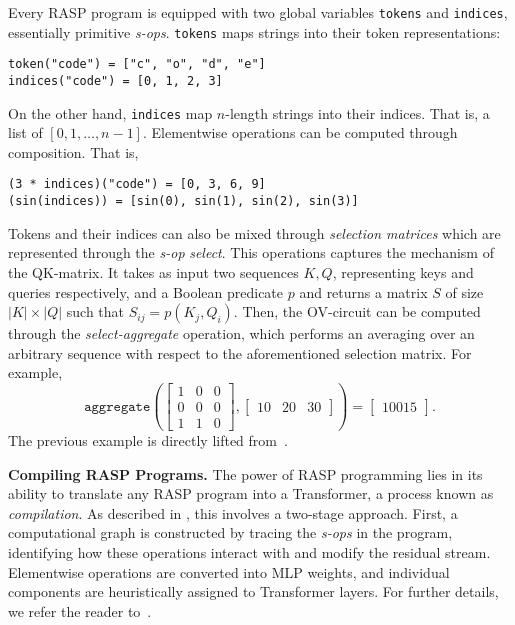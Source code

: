 \documentclass{article}
\begin{document}
Every RASP program is equipped with two global variables \texttt{tokens} and \texttt{indices},
essentially primitive \textit{s-ops}. \texttt{tokens} maps strings into their token representations:
\begin{center}
\begin{verbatim}token("code") = ["c", "o", "d", "e"]
indices("code") = [0, 1, 2, 3]
\end{verbatim}
\end{center}
On the other hand, \texttt{indices} map $n$-length strings into their indices. That is, 
a list of $[0, 1, \ldots, n-1]$. Elementwise operations can be computed through composition. That
is,
\begin{verbatim}(3 * indices)("code") = [0, 3, 6, 9]
(sin(indices)) = [sin(0), sin(1), sin(2), sin(3)]
\end{verbatim}
Tokens and their indices can also be mixed through \textit{selection matrices} which are represented
through the \textit{s-op} \textit{select}. This operations captures the mechanism of the QK-matrix.
It takes as input two sequences $K, Q$, representing keys and queries respectively, 
and a Boolean predicate $p$ and returns a matrix $S$ of size $|K| \times |Q|$ such that 
$S_{ij} = p(K_j, Q_i)$. Then, the OV-circuit can be computed through the \textit{select-aggregate}
operation, which performs an averaging over an arbitrary sequence with respect to the
aforementioned selection matrix. For example,
\[
\texttt{aggregate}\left(\begin{bmatrix}
1 & 0 & 0 \\ 
0 & 0 & 0 \\ 
1 & 1 & 0
\end{bmatrix}, \begin{bmatrix}10 & 20 & 30\end{bmatrix}\right)
= \begin{bmatrix}10 0 15\end{bmatrix}.
\]
The previous example is directly lifted from~\cite{lindner_tracr_2023}. 

\textbf{Compiling RASP Programs.} The power of RASP programming lies in its ability to translate
any RASP program into a Transformer, a process known as \textit{compilation}.
As described in \cite{lindner_tracr_2023}, this involves a two-stage approach.
First, a computational graph is constructed by tracing the \textit{s-ops} in the program,
identifying how these operations interact with and modify the residual stream.
Elementwise operations are converted into MLP weights, and individual components
are heuristically assigned to Transformer layers.
For further details, we refer the reader to~\cite{lindner_tracr_2023}. 
\end{document}
